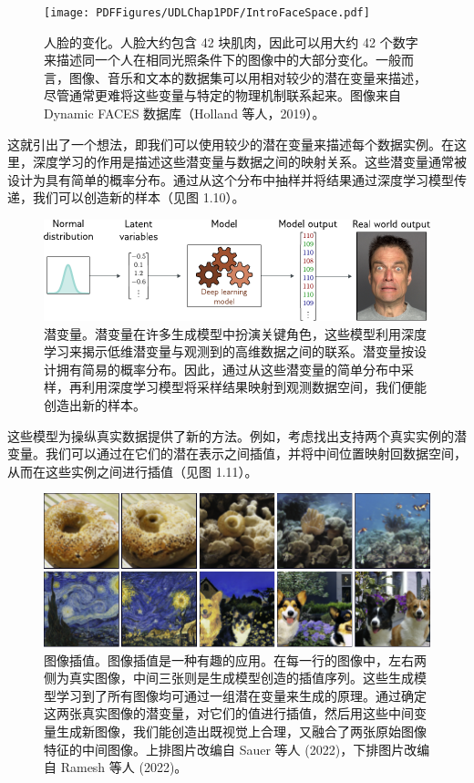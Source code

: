 \documentclass[lang=cn,newtx,10pt,scheme=chinese]{elegantbook}
\begin{document}
\begin{figure}
	\centering
	\texttt{[image: PDFFigures/UDLChap1PDF/IntroFaceSpace.pdf]}
	\caption{人脸的变化。人脸大约包含 42 块肌肉，因此可以用大约 42 个数字来描述同一个人在相同光照条件下的图像中的大部分变化。一般而言，图像、音乐和文本的数据集可以用相对较少的潜在变量来描述，尽管通常更难将这些变量与特定的物理机制联系起来。图像来自 Dynamic FACES 数据库（Holland 等人，2019）。}
\end{figure}

这就引出了一个想法，即我们可以使用较少的潜在变量来描述每个数据实例。在这里，深度学习的作用是描述这些潜变量与数据之间的映射关系。这些潜变量通常被设计为具有简单的概率分布。通过从这个分布中抽样并将结果通过深度学习模型传递，我们可以创造新的样本（见图 1.10）。

\begin{figure}
	\centering
	\includegraphics[width=0.7\linewidth]{PDFFigures/UDLChap1PDF/IntroLatent.pdf}
	\caption{潜变量。潜变量在许多生成模型中扮演关键角色，这些模型利用深度学习来揭示低维潜变量与观测到的高维数据之间的联系。潜变量按设计拥有简易的概率分布。因此，通过从这些潜变量的简单分布中采样，再利用深度学习模型将采样结果映射到观测数据空间，我们便能创造出新的样本。}
\end{figure}


这些模型为操纵真实数据提供了新的方法。例如，考虑找出支持两个真实实例的潜变量。我们可以通过在它们的潜在表示之间插值，并将中间位置映射回数据空间，从而在这些实例之间进行插值（见图 1.11）。

\begin{figure}
	\centering
	\includegraphics[width=0.7\linewidth]{PDFFigures/UDLChap1PDF/IntroInterpolate.pdf}
	\caption{图像插值。图像插值是一种有趣的应用。在每一行的图像中，左右两侧为真实图像，中间三张则是生成模型创造的插值序列。这些生成模型学习到了所有图像均可通过一组潜在变量来生成的原理。通过确定这两张真实图像的潜变量，对它们的值进行插值，然后用这些中间变量生成新图像，我们能创造出既视觉上合理，又融合了两张原始图像特征的中间图像。上排图片改编自 Sauer 等人 (2022)，下排图片改编自 Ramesh 等人 (2022)。}
\end{figure}
\end{document}
